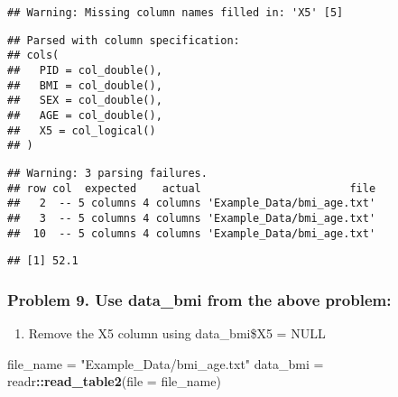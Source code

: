 \documentclass[]{article}
\newenvironment{Shaded}{\begin{snugshade}}{\end{snugshade}}
\newcommand{\DataTypeTok}[1]{\textcolor[rgb]{0.13,0.29,0.53}{#1}}
\newcommand{\KeywordTok}[1]{\textcolor[rgb]{0.13,0.29,0.53}{\textbf{#1}}}
\newcommand{\NormalTok}[1]{#1}
\newcommand{\OperatorTok}[1]{\textcolor[rgb]{0.81,0.36,0.00}{\textbf{#1}}}
\newcommand{\StringTok}[1]{\textcolor[rgb]{0.31,0.60,0.02}{#1}}
\providecommand{\tightlist}{%
  \setlength{\itemsep}{0pt}\setlength{\parskip}{0pt}}
\begin{document}
\begin{verbatim}
## Warning: Missing column names filled in: 'X5' [5]
\end{verbatim}

\begin{verbatim}
## Parsed with column specification:
## cols(
##   PID = col_double(),
##   BMI = col_double(),
##   SEX = col_double(),
##   AGE = col_double(),
##   X5 = col_logical()
## )
\end{verbatim}

\begin{verbatim}
## Warning: 3 parsing failures.
## row col  expected    actual                       file
##   2  -- 5 columns 4 columns 'Example_Data/bmi_age.txt'
##   3  -- 5 columns 4 columns 'Example_Data/bmi_age.txt'
##  10  -- 5 columns 4 columns 'Example_Data/bmi_age.txt'
\end{verbatim}

\begin{Shaded}
\end{Shaded}

\begin{verbatim}
## [1] 52.1
\end{verbatim}

\hypertarget{problem-9.-use-data_bmi-from-the-above-problem}{%
\subsubsection{Problem 9. Use data\_bmi from the above
problem:}\label{problem-9.-use-data_bmi-from-the-above-problem}}

\begin{enumerate}
\def\labelenumi{\alph{enumi}.}
\tightlist
\item
  Remove the X5 column using data\_bmi\$X5 = NULL
\end{enumerate}

\begin{Shaded}
\begin{Highlighting}[]
\NormalTok{file_name =}\StringTok{ "Example_Data/bmi_age.txt"}
\NormalTok{data_bmi =}\StringTok{ }\NormalTok{readr}\OperatorTok{::}\KeywordTok{read_table2}\NormalTok{(}\DataTypeTok{file =}\NormalTok{ file_name)}
\end{Highlighting}
\end{Shaded}
\end{document}
